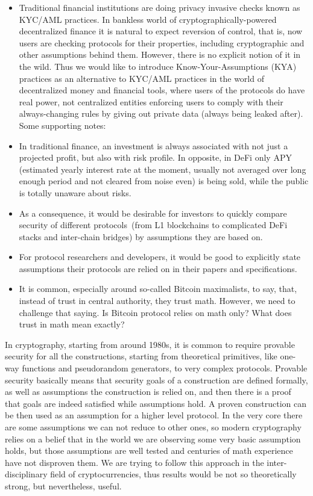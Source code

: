 \documentclass{article}   %
\begin{document}
\begin{itemize}
\item{} Traditional financial institutions are doing privacy invasive checks known as KYC/AML practices.
In bankless world of cryptographically-powered decentralized finance it is natural to expect reversion of control, that is, 
now users are checking protocols for their properties, including cryptographic and other assumptions behind them.
However, there is no explicit notion of it in the wild. Thus we would like to introduce Know-Your-Assumptions (KYA) practices  
as an alternative to KYC/AML practices in the world of decentralized money and financial tools, where users 
of the protocols do have real power, not centralized entities enforcing users to comply with their always-changing rules by giving out private data (always being leaked after). Some supporting notes:   

\item{} In traditional finance, an investment is always associated with not 
just a projected profit, but also with risk profile. In opposite, in DeFi only 
APY (estimated yearly interest rate at the moment, usually not averaged over long enough period and not cleared from noise even) is being sold, while the public is totally unaware about risks.

\item{} As a consequence, it would be desirable for investors to quickly compare security of different protocols~(from L1 blockchains to complicated DeFi stacks and inter-chain bridges) by assumptions they are based on.

\item{} For protocol researchers and developers, it would be good to explicitly state assumptions their protocols are relied on in their papers and specifications. 

\item{} It is common, especially around so-called Bitcoin maximalists, to say, that, instead of trust in central authority, they trust math. However, we need to challenge that saying. Is Bitcoin protocol relies on math only? What does trust in math mean exactly?
\end{itemize}

In cryptography, starting from around 1980s, it is common to require provable security for all the constructions, starting from theoretical primitives, like one-way functions and pseudorandom generators, to very complex protocols. Provable security basically means that security goals of a construction are defined formally, as well as assumptions the construction is relied on, and then 
there is a proof that goals are indeed satisfied while assumptions hold. A proven construction can be then used as an assumption for a higher level protocol. In the very core there are some assumptions we can not reduce to other ones, so modern cryptography relies on a belief that in the world we are observing some very basic assumption holds, but those assumptions are well tested and centuries of math experience have not disproven them. 
We are trying to follow this approach in the inter-disciplinary field of cryptocurrencies, thus results would be not so theoretically strong, but nevertheless, useful. 
\end{document}
